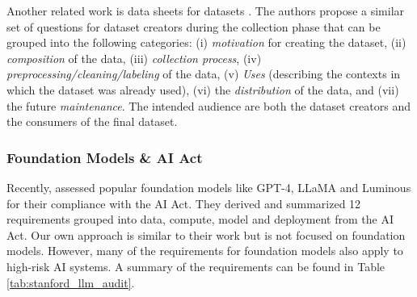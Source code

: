 Another related work is data sheets for datasets \citep{Gebru2021_DataSheets}. The authors propose a similar set of questions for dataset creators during the collection phase that can be grouped into the following categories: (i) \emph{motivation} for creating the dataset, (ii) \emph{composition} of the data, (iii) \emph{collection process}, (iv)  \emph{preprocessing/cleaning/labeling} of the data, (v) \emph{Uses} (describing the contexts in which the dataset was already used), (vi) the \emph{distribution} of the data, and (vii) the future \emph{maintenance}. The intended audience are both the dataset creators and the consumers of the final dataset.

\subsubsection{Foundation Models \& AI Act}
Recently, \cite{bommasani2023eu-ai-act} assessed popular foundation models like GPT-4, LLaMA and Luminous for their compliance with the AI Act. They derived and summarized 12 requirements grouped into data, compute, model and deployment from the AI Act. Our own approach is similar to their work but is not focused on foundation models. However, many of the requirements for foundation models also apply to high-risk AI systems. A summary of the requirements can be found in Table \ref{tab:stanford_llm_audit}.

